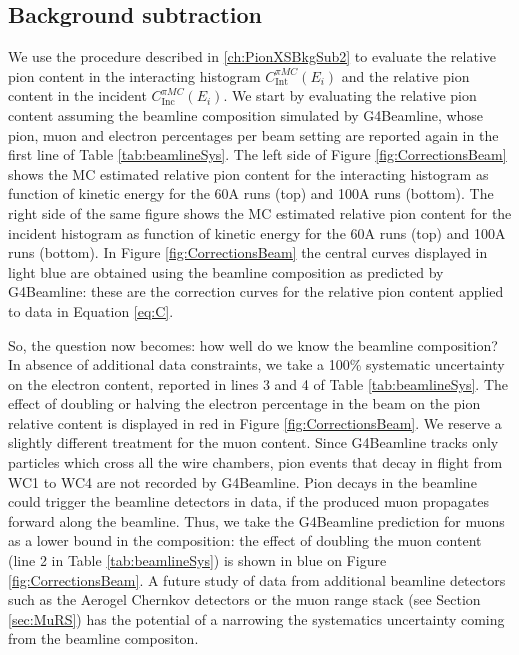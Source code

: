 \subsection{Background subtraction}\label{ch:BKGsubXSPuppa}
We use the procedure described in \ref{ch:PionXSBkgSub2} to evaluate the relative pion content in the interacting histogram $C^{\pi MC}_{\text{Int}} (E_{i})$  and the relative pion content in the incident $C^{\pi MC}_{\text{Inc}} (E_{i})$. We start by evaluating the relative pion content assuming the beamline composition simulated by G4Beamline, whose pion, muon and electron percentages per beam setting are reported again in the first line of Table \ref{tab:beamlineSys}. The left side of Figure \ref{fig:CorrectionsBeam} shows the  MC estimated  relative pion content for the interacting histogram as function of kinetic energy for the 60A runs (top) and 100A runs (bottom). The right side of the same figure shows the  MC estimated  relative pion content for the incident histogram as function of kinetic energy for the 60A runs (top) and 100A runs (bottom). In Figure \ref{fig:CorrectionsBeam} the central curves displayed in light blue are obtained using the beamline composition as predicted by G4Beamline: these are the correction curves for the relative pion content applied to data in Equation \ref{eq:C}.

So, the question now becomes: how well do we know the beamline composition? In absence of additional data constraints,  we take a 100\% systematic uncertainty on the electron content, reported in lines 3 and 4 of Table \ref{tab:beamlineSys}. The effect of doubling or halving the electron percentage in the beam on the pion relative content is displayed in red in Figure \ref{fig:CorrectionsBeam}. We reserve a slightly different treatment for the muon content. Since G4Beamline tracks only particles which cross all the wire chambers, pion events that decay in flight from WC1 to WC4 are not recorded by G4Beamline. Pion decays in the beamline could  trigger the beamline detectors in data, if the produced muon propagates forward along the beamline. Thus, we take the G4Beamline prediction for muons as a lower bound in the composition: the effect of doubling the muon content (line 2 in Table \ref{tab:beamlineSys}) is shown in blue on Figure \ref{fig:CorrectionsBeam}. A future study of data from additional beamline detectors such as the Aerogel Chernkov detectors \cite{detectorPaper} or the muon range stack (see Section \ref{sec:MuRS}) has the potential of a narrowing the systematics uncertainty coming from the beamline compositon.


